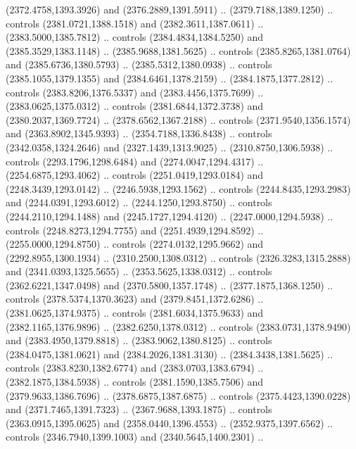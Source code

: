 \begin{scope}[shift={(19.44451,-318.97965)}]
\begin{scope}[shift={(-2093.8013,-1176.4989)}]
\begin{scope}
\begin{scope}
\begin{scope}
\begin{scope}[cm={{0.5939,0.0,0.0,0.5939,(746.01496,1124.7564)}}]
              (2372.4758,1393.3926) and (2376.2889,1391.5911) .. (2379.7188,1389.1250) ..
              controls (2381.0721,1388.1518) and (2382.3611,1387.0611) ..
              (2383.5000,1385.7812) .. controls (2384.4834,1384.5250) and
              (2385.3529,1383.1148) .. (2385.9688,1381.5625) .. controls
              (2385.8265,1381.0764) and (2385.6736,1380.5793) .. (2385.5312,1380.0938) ..
              controls (2385.1055,1379.1355) and (2384.6461,1378.2159) ..
              (2384.1875,1377.2812) .. controls (2383.8206,1376.5337) and
              (2383.4456,1375.7699) .. (2383.0625,1375.0312) .. controls
              (2381.6844,1372.3738) and (2380.2037,1369.7724) .. (2378.6562,1367.2188) ..
              controls (2371.9540,1356.1574) and (2363.8902,1345.9393) ..
              (2354.7188,1336.8438) .. controls (2342.0358,1324.2646) and
              (2327.1439,1313.9025) .. (2310.8750,1306.5938) .. controls
              (2293.1796,1298.6484) and (2274.0047,1294.4317) .. (2254.6875,1293.4062) ..
              controls (2251.0419,1293.0184) and (2248.3439,1293.0142) ..
              (2246.5938,1293.1562) .. controls (2244.8435,1293.2983) and
              (2244.0391,1293.6012) .. (2244.1250,1293.8750) .. controls
              (2244.2110,1294.1488) and (2245.1727,1294.4120) .. (2247.0000,1294.5938) ..
              controls (2248.8273,1294.7755) and (2251.4939,1294.8592) ..
              (2255.0000,1294.8750) .. controls (2274.0132,1295.9662) and
              (2292.8955,1300.1934) .. (2310.2500,1308.0312) .. controls
              (2326.3283,1315.2888) and (2341.0393,1325.5655) .. (2353.5625,1338.0312) ..
              controls (2362.6221,1347.0498) and (2370.5800,1357.1748) ..
              (2377.1875,1368.1250) .. controls (2378.5374,1370.3623) and
              (2379.8451,1372.6286) .. (2381.0625,1374.9375) .. controls
              (2381.6034,1375.9633) and (2382.1165,1376.9896) .. (2382.6250,1378.0312) ..
              controls (2383.0731,1378.9490) and (2383.4950,1379.8818) ..
              (2383.9062,1380.8125) .. controls (2384.0475,1381.0621) and
              (2384.2026,1381.3130) .. (2384.3438,1381.5625) .. controls
              (2383.8230,1382.6774) and (2383.0703,1383.6794) .. (2382.1875,1384.5938) ..
              controls (2381.1590,1385.7506) and (2379.9633,1386.7696) ..
              (2378.6875,1387.6875) .. controls (2375.4423,1390.0228) and
              (2371.7465,1391.7323) .. (2367.9688,1393.1875) .. controls
              (2363.0915,1395.0625) and (2358.0440,1396.4553) .. (2352.9375,1397.6562) ..
              controls (2346.7940,1399.1003) and (2340.5645,1400.2301) ..

\end{scope}
\end{scope}
\end{scope}
\end{scope}
\end{scope}
\end{scope}
